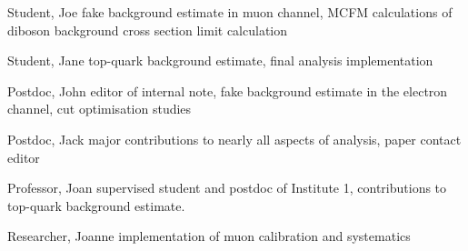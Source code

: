 \begin{atlascontribute}
\item[Student, Joe] fake background estimate in muon channel, MCFM
  calculations of diboson background cross section limit calculation
\item[Student, Jane] top-quark background estimate, final
  analysis implementation
\item[Postdoc, John] editor of internal note, fake background
  estimate in the electron channel, cut optimisation studies
\item[Postdoc, Jack] major contributions to nearly all aspects of
  analysis, paper contact editor
\item[Professor, Joan] supervised student and postdoc of Institute 1,
  contributions to top-quark background estimate.
\item[Researcher, Joanne] implementation of muon calibration and systematics
\end{atlascontribute}
\clearpage
